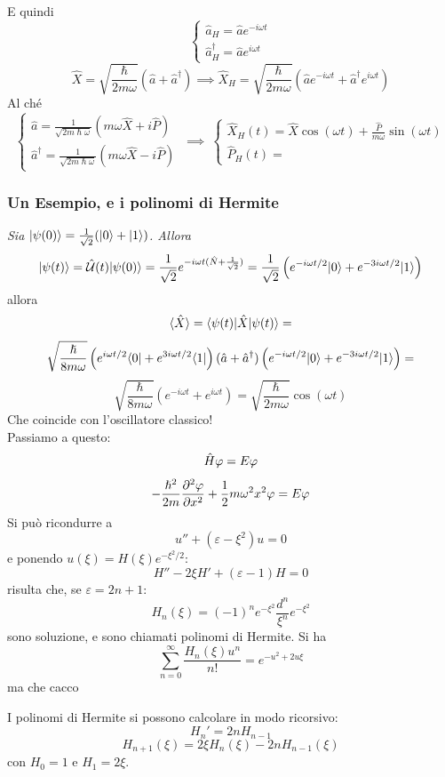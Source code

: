 E quindi
\[
\begin{cases}
        \hat a_H = \hat a e^{-i\omega t}\\
        \hat a_H^\dag = \hat a e^{i\omega t}
\end{cases}
\]
\[
    \hat X = \sqrt{\frac{\hslash}{2m\omega}}(\hat a + \hat a ^\dag) \implies \hat X_H = \sqrt{\frac{\hslash}{2m\omega}}(\hat a e^{-i\omega t} + \hat a ^\dag  e^{i\omega t})
\]
Al ché
\[
\begin{cases}
    \hat a = \frac{1}{\sqrt{2m\hslash\omega}}(m\omega \hat X + i \hat P)\\
    \hat a^\dag = \frac{1}{\sqrt{2m\hslash\omega}}(m\omega \hat X - i \hat P)
\end{cases}
\ \implies \ 
\begin{cases}
    \hat X_H(t) = \hat X \cos (\omega t) + \frac{\hat P}{m\omega}\sin (\omega t)\\
    \hat P_H(t) = 
\end{cases}
\]

\subsubsection*{Un Esempio, e i polinomi di Hermite}
\textit{Sia $|\psi(0)\ket = \frac{1}{\sqrt 2}(|0\ket + |1\ket)$. Allora}
\[
    |\psi (t) \ket = \U(t) |\psi(0)\ket = \sqrthalf e^{-i\omega t (\N + \sqrthalf)} = \sqrthalf\left(e^{-i\omega t/2}\state 0 + e^{-3i\omega t/2}\state 1\right)
\]
allora
\[
    \bra \hat X \ket = \bra \psi(t) | \hat X | \psi (t) \ket = \]\[
    \sqrt{\frac{\hslash}{8m\omega}}\left(e^{i\omega t/2}\dstate 0 + e^{3i\omega t/2}\dstate 1\right)(\hat a + \hat a^\dag) \left(e^{-i\omega t/2}\state 0 + e^{-3i\omega t/2}\state 1\right) = \]\[
    \sqrt{\frac{\hslash}{8m\omega}}(e^{-i\omega t} + e^{i\omega t}) = \sqrt{\frac{\hslash}{2m\omega}} \cos(\omega t)
\]
Che coincide con l'oscillatore classico!\\
Passiamo a questo:
\[
    \H\vphi = E\vphi \]\[
    -\frac{\hslash^2}{2m} \sderiv[x] \vphi + \half m\omega^2 x^2 \vphi = E\vphi
\]
Si può ricondurre a 
\[
    u'' + (\varepsilon - \xi^2)u = 0
\]
e ponendo $u(\xi) = H(\xi)e^{-\xi^2/2}$:
\[
    H'' - 2\xi H' + (\varepsilon - 1)H = 0
\]
risulta che, se $\varepsilon = 2n + 1$:
\[
    H_n(\xi) = (-1)^n e^{-\xi^2}\frac{d^n}{\xi^n}e^{-\xi^2}
\]
sono soluzione, e sono chiamati polinomi di Hermite. Si ha
\[
    \sum_{n=0}^{\infty}\frac{H_n(\xi) u^n}{n!}=e^{-u^2+2u\xi}
\]
ma che cacco

I polinomi di Hermite si possono calcolare in modo ricorsivo:
\[
    H_n' = 2nH_{n-1}\]\[
    H_{n+1}(\xi) = 2\xi H_n(\xi) - 2nH_{n-1}(\xi)
\]
con $H_0 = 1$ e $H_1 = 2\xi$.
